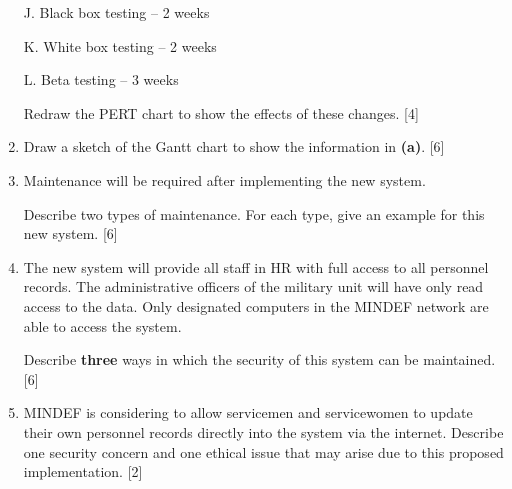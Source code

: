\begin{enumerate}
J. Black box testing -- 2 weeks 

K. White box testing -- 2 weeks

L. Beta testing -- 3 weeks

Redraw the PERT chart to show the effects of these changes. \hfill{}{[}4{]}
\item Draw a sketch of the Gantt chart to show the information in \textbf{(a)}.
\hfill{}{[}6{]}
\item Maintenance will be required after implementing the new system.

Describe two types of maintenance. For each type, give an example
for this new system. \hfill{}{[}6{]}
\item The new system will provide all staff in HR with full access to all
personnel records. The administrative officers of the military unit
will have only read access to the data. Only designated computers
in the MINDEF network are able to access the system.

Describe \textbf{three} ways in which the security of this system
can be maintained. \hfill{}{[}6{]}
\item MINDEF is considering to allow servicemen and servicewomen to update
their own personnel records directly into the system via the internet.
Describe one security concern and one ethical issue that may arise
due to this proposed implementation.\hfill{} {[}2{]}
\end{enumerate}